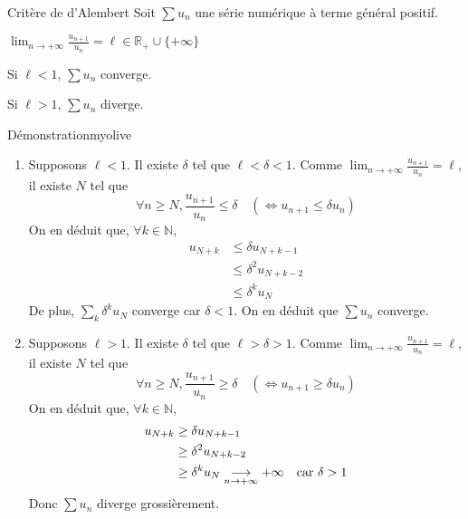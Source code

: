     \begin{prop}{Critère de d’Alembert}{}
        Soit $\sum u_n$ une série numérique à terme général positif.
        \begin{suppose}
            \item $\lim_{n \rightarrow +\infty} \frac{u_{n+1}}{u_n} = \ell \in \mathbb{R}_+ \cup \{ +\infty \}$
        \end{suppose}
        \begin{alors}
            \item Si $\ell < 1$, $\sum u_n$ converge.
            \item Si $\ell > 1$, $\sum u_n$ diverge.
        \end{alors}
    \end{prop}

    \begin{demo}{Démonstration}{myolive}
        \begin{enumerate}
            \item Supposons $\ell < 1$. Il existe $\delta$ tel que $\ell < \delta < 1$. Comme $\lim_{n \rightarrow +\infty} \frac{u_{n+1}}{u_n} = \ell$, il existe $N$ tel que 
            \[ \forall n \geq N, \frac{u_{n+1}}{u_n} \leq \delta \quad \left(\iff u_{n+1} \leq \delta u_n\right) \] 
            On en déduit que, $\forall k \in \mathbb{N}$,
            \begin{align*}
                u_{N+k} &\leq \delta u_{N + k - 1} \\
                &\leq \delta^2 u_{N + k - 2} \\
                &\leq \delta^k u_N  
            \end{align*}
            De plus, $\sum_k \delta^k u_N$ converge car $\delta < 1$. On en déduit que $\sum u_n$ converge.
            \item Supposons $\ell > 1$. Il existe $\delta$ tel que $\ell > \delta > 1$. Comme $\lim_{n \rightarrow +\infty} \frac{u_{n+1}}{u_n} = \ell$, il existe $N$ tel que 
            \[ \forall n \geq N, \frac{u_{n+1}}{u_n} \geq \delta \quad \left(\iff u_{n+1} \geq \delta u_n\right) \] 
            On en déduit que, $\forall k \in \mathbb{N}$,
            \begin{align*}
                u_{N+k} &\geq \delta u_{N + k - 1} \\
                &\geq \delta^2 u_{N + k - 2} \\
                &\geq \delta^k u_N \underset{n \rightarrow +\infty}{\longrightarrow} +\infty \quad \text{car } \delta > 1 
            \end{align*}
            Donc $\sum u_n$ diverge grossièrement.
        \end{enumerate}
    \end{demo}

